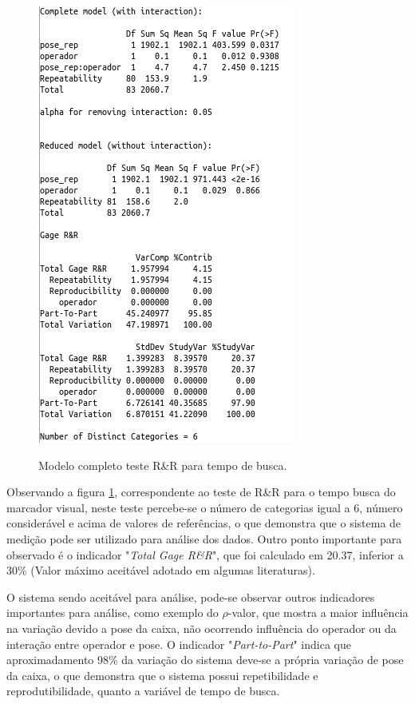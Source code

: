 \begin{figure}[h!]
  \caption{Modelo completo teste R\&R para tempo de busca.}
  \centering
  \includegraphics[scale=0.55]{images/rr_tb.png}
  \label{fig:rr1}
\end{figure}


Observando a figura \ref*{fig:rr1}, correspondente ao teste de R\&R para o tempo busca do marcador visual, neste teste percebe-se o número de categorias igual a 6, número considerável e acima de valores de referências, o que demonstra que o sistema de medição pode ser utilizado para análise dos dados. Outro ponto importante para observado é o indicador "\textit{Total Gage R\&R}", que foi calculado em 20.37, inferior a 30\% (Valor máximo aceitável adotado em algumas literaturas). 

O sistema sendo aceitável para análise, pode-se observar outros indicadores importantes para análise, como exemplo do $\rho$-valor, que mostra a maior influência na variação devido a pose da caixa, não ocorrendo influência do operador ou da interação entre operador e pose. O indicador "\textit{Part-to-Part}" indica que aproximadamento 98\% da variação do sistema deve-se a própria variação de pose da caixa, o que demonstra que o sistema possui repetibilidade e reprodutibilidade, quanto a variável de tempo de busca.

